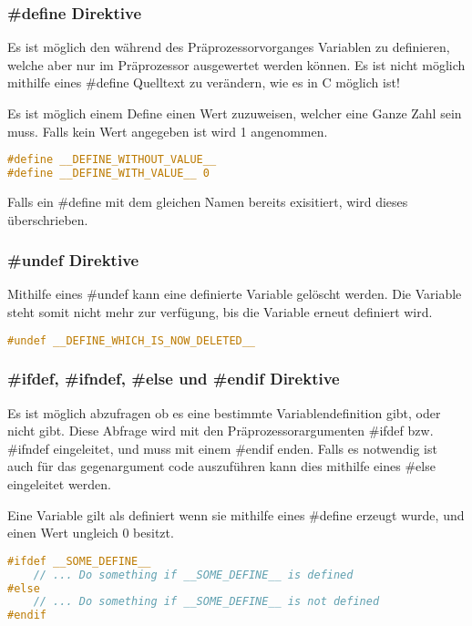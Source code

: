 \subsubsection{\#define Direktive}

Es ist m\"oglich den w\"ahrend des Pr\"aprozessorvorganges Variablen zu definieren, welche aber nur im Pr\"aprozessor ausgewertet werden k\"onnen. Es ist nicht m\"oglich mithilfe eines \#define Quelltext zu ver\"andern, wie es in C m\"oglich ist!

Es ist m\"oglich einem Define einen Wert zuzuweisen, welcher eine Ganze Zahl sein muss. Falls kein Wert angegeben ist wird 1 angenommen.

\begin{lstlisting}[language=C]
#define __DEFINE_WITHOUT_VALUE__
#define __DEFINE_WITH_VALUE__ 0
\end{lstlisting}

Falls ein \#define mit dem gleichen Namen bereits exisitiert, wird dieses \"uberschrieben.

\subsubsection{\#undef Direktive}

Mithilfe eines \#undef kann eine definierte Variable gel\"oscht werden. Die Variable steht somit nicht mehr zur verf\"ugung, bis die Variable erneut definiert wird.

\begin{lstlisting}[language=C]
#undef __DEFINE_WHICH_IS_NOW_DELETED__
\end{lstlisting}

\subsubsection{\#ifdef, \#ifndef, \#else und \#endif Direktive}

Es ist m\"oglich abzufragen ob es eine bestimmte Variablendefinition gibt, oder nicht gibt. Diese Abfrage wird mit den Pr\"aprozessorargumenten \#ifdef bzw. \#ifndef eingeleitet, und muss mit einem \#endif enden. Falls es notwendig ist auch f\"ur das gegenargument code auszuf\"uhren kann dies mithilfe eines \#else eingeleitet werden.

Eine Variable gilt als definiert wenn sie mithilfe eines \#define erzeugt wurde, und einen Wert ungleich 0 besitzt.

\begin{lstlisting}[language=C]
#ifdef __SOME_DEFINE__
	// ... Do something if __SOME_DEFINE__ is defined
#else
	// ... Do something if __SOME_DEFINE__ is not defined
#endif
\end{lstlisting}

